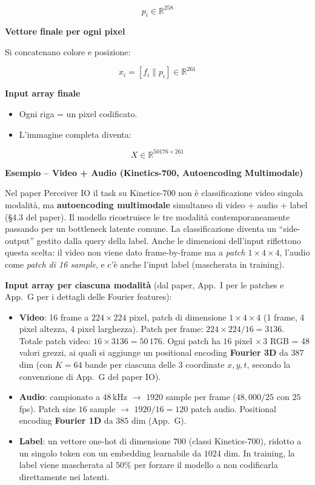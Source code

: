 \documentclass[
  11pt,
]{article}
\begin{document}
\[p_{i} \in \mathbb{R}^{258}\]

\textbf{Vettore finale per ogni pixel}

Si concatenano colore e posizione:

\[x_{i} = \left\lbrack f_{i}\| p_{i} \right\rbrack \in \mathbb{R}^{261}\]

\textbf{Input array finale}

\begin{itemize}
\item
  Ogni riga = un pixel codificato.
\item
  L'immagine completa diventa:
\end{itemize}

\[X \in \mathbb{R}^{50176 \times 261}\]

\textbf{Esempio -- Video + Audio (Kinetics-700, Autoencoding Multimodale)}

\begin{notabox}[title={\textbf{Attenzione: Kinetics nel Perceiver IO è autoencoding multimodale, non classificazione video pura}}]
Nel paper Perceiver IO il task su Kinetics-700 non è classificazione video singola modalità, ma \textbf{autoencoding multimodale} simultaneo di video + audio + label (\S4.3 del paper). Il modello ricostruisce le tre modalità contemporaneamente passando per un bottleneck latente comune. La classificazione diventa un ``side-output'' gestito dalla query della label. Anche le dimensioni dell'input riflettono questa scelta: il video non viene dato frame-by-frame ma a \emph{patch $1 \times 4 \times 4$}, l'audio come \emph{patch di 16 sample}, e c'è anche l'input label (mascherata in training).
\end{notabox}

\textbf{Input array per ciascuna modalità} (dal paper, App.\ I per le patches e App.\ G per i dettagli delle Fourier features):

\begin{itemize}\setlength\itemsep{0.3em}
\item \textbf{Video}: 16 frame a $224 \times 224$ pixel, patch di dimensione $1 \times 4 \times 4$ (1 frame, 4 pixel altezza, 4 pixel larghezza). Patch per frame: $224 \times 224 / 16 = 3136$. Totale patch video: $16 \times 3136 = 50\,176$. Ogni patch ha $16$ pixel $\times\, 3$ RGB = 48 valori grezzi, ai quali si aggiunge un positional encoding \textbf{Fourier 3D} da $387$ dim (con $K=64$ bande per ciascuna delle 3 coordinate $x, y, t$, secondo la convenzione di App.\ G del paper IO).
\item \textbf{Audio}: campionato a $48$\,kHz $\to$ $1920$ sample per frame ($48{,}000/25$ con $25$ fps). Patch size $16$ sample $\to$ $1920/16 = 120$ patch audio. Positional encoding \textbf{Fourier 1D} da $385$ dim (App.\ G).
\item \textbf{Label}: un vettore one-hot di dimensione $700$ (classi Kinetics-700), ridotto a un singolo token con un embedding learnabile da $1024$ dim. In training, la label viene mascherata al $50\%$ per forzare il modello a non codificarla direttamente nei latenti.
\end{itemize}
\end{document}

